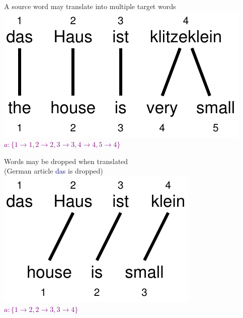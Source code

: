 \documentclass[landscape]{slides}
\newcommand{\example}[1]{\textcolor{darkblue}{\rm #1}}
\newcommand{\maths}[1]{\textcolor{purple}{#1}}
\begin{document}
\begin{center}\vspace{10mm}
A source word may translate into multiple target words \\[10mm]
\includegraphics[scale=1.5]{haus-ist-klein-alignment-multiple.pdf}\\[10mm]
\maths{$a: \{ 1 \rightarrow 1, 2 \rightarrow 2, 3 \rightarrow 3, 4 \rightarrow 4, 5 \rightarrow 4 \}$}
\end{center}


\begin{center}\vspace{7mm}
Words may be dropped when translated\\
(German article \example{das} is dropped)\\[10mm]
\includegraphics[scale=1.5]{haus-ist-klein-alignment-zerofert.pdf}\\[10mm]
\maths{$a: \{ 1 \rightarrow 2, 2 \rightarrow 3, 3 \rightarrow 4 \}$}
\end{center}

\end{document}
